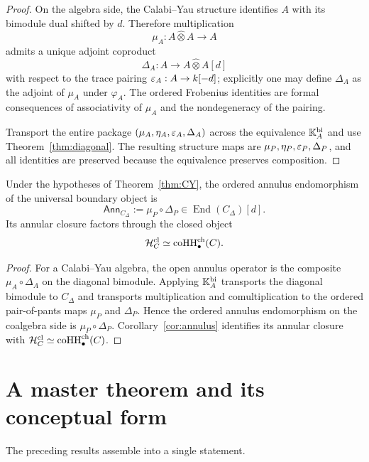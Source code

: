 \begin{proof}
On the algebra side, the Calabi--Yau structure identifies $A$ with its bimodule dual shifted by
$d$. Therefore multiplication
\[
\mu_A:A\widehat\otimes A\to A
\]
admits a unique adjoint coproduct
\[
\Delta_A:A\to A\widehat\otimes A[d]
\]
with respect to the trace pairing $\varepsilon_A:A\to k[-d]$; explicitly one may define $\Delta_A$ as the
adjoint of $\mu_A$ under $\varphi_A$. The ordered Frobenius identities are formal consequences of
associativity of $\mu_A$ and the nondegeneracy of the pairing.

Transport the entire package $(\mu_A,\eta_A,\varepsilon_A,\Delta_A)$ across the equivalence
$\mathbb{K}_A^{\mathrm{bi}}$ and use Theorem~\ref{thm:diagonal}. The resulting structure maps are
$\mu_P,\eta_P,\varepsilon_P,\Delta_P$, and all identities are preserved because the equivalence preserves
composition.
\end{proof}

\begin{corollary}
\ClaimStatusProvedHere
\label{cor:cardy}
Under the hypotheses of Theorem~\ref{thm:CY}, the ordered annulus endomorphism of the universal
boundary object is
\[
\mathsf{Ann}_{C_\Delta}:=\mu_P\circ \Delta_P\in \operatorname{End}(C_\Delta)[d].
\]
Its annular closure factors through the closed object
\[
\mathcal H_C^{\mathrm{cl}}\simeq \operatorname{coHH}^{\mathrm{ch}}_\bullet(C).
\]
\end{corollary}

\begin{proof}
For a Calabi--Yau algebra, the open annulus operator is the composite
$\mu_A\circ\Delta_A$ on the diagonal bimodule.
Applying $\mathbb{K}_A^{\mathrm{bi}}$ transports the diagonal bimodule to
$C_\Delta$ and transports multiplication and comultiplication to the
ordered pair-of-pants maps $\mu_P$ and $\Delta_P$.
Hence the ordered annulus endomorphism on the coalgebra side is
$\mu_P\circ\Delta_P$.
Corollary~\ref{cor:annulus} identifies its annular closure with
$\mathcal H_C^{\mathrm{cl}}\simeq\operatorname{coHH}^{\mathrm{ch}}_\bullet(C)$.
\end{proof}

\section{A master theorem and its conceptual form}
\label{sec:master}

The preceding results assemble into a single statement.


